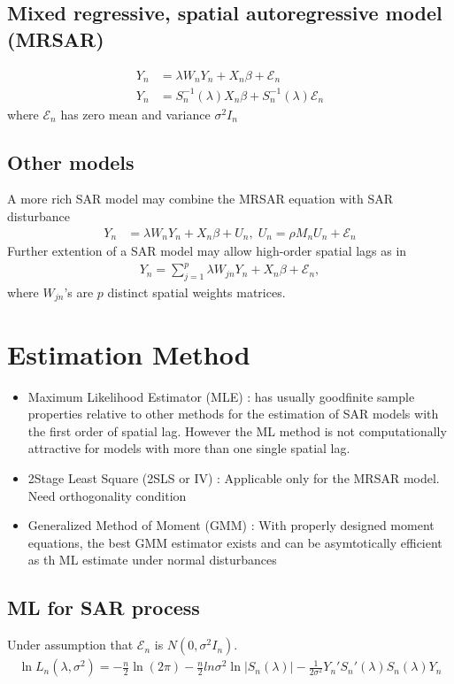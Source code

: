 \documentclass[11pt]{article}
\begin{document}
\subsection{Mixed regressive, spatial autoregressive model (MRSAR)}
\begin{align}
Y_n &=\lambda W_n Y_n + X_n \beta + \mathcal{E}_n \nonumber \\
Y_n &= S_n^{-1}(\lambda) X_n \beta +S_n^{-1}(\lambda) \mathcal{E}_n \nonumber
\end{align}
where $\mathcal{E}_n$ has zero mean and variance $\sigma^2 I_n$
\subsection{Other models}
A more rich SAR model may combine the MRSAR equation with SAR disturbance
\begin{align}
Y_n &= \lambda W_n Y_n + X_n \beta + U_n , \; U_n = \rho M_n U_n + \mathcal{E}_n \nonumber 
\end{align}
Further extention of a SAR model may allow high-order spatial lags as in
\begin{align}
Y_n = \sum_{j=1}^{p} \lambda W_{jn} Y_n + X_n \beta + \mathcal{E}_n, \nonumber
\end{align}
where $W_{jn}$'s are $p$ distinct spatial weights matrices.

\section{Estimation Method}
\begin{itemize}
	\item Maximum Likelihood Estimator (MLE) : has usually goodfinite sample properties relative to other methods for the estimation of SAR models with the first order of spatial lag. However the ML method is not computationally attractive for models with more than one single spatial lag.
	\item 2Stage Least Square (2SLS or IV) : Applicable only for the MRSAR model. Need orthogonality condition
	\item Generalized Method of Moment (GMM) : With properly designed moment equations, the best GMM estimator exists and can be asymtotically efficient as th ML estimate under normal disturbances
\end{itemize}

\subsection{ML for SAR process}
Under assumption that $\mathcal{E}_n$ is $N(0,\sigma^2 I_n)$.
\begin{align}
\ln L_n(\lambda,\sigma^2) = -\frac{n}{2} \ln(2\pi) - \frac{n}{2} ln \sigma^2 \ln|S_n(\lambda)| - \frac{1}{2\sigma^2} Y_n'S_n'(\lambda)S_n(\lambda)Y_n\nonumber
\end{align}
\end{document}

